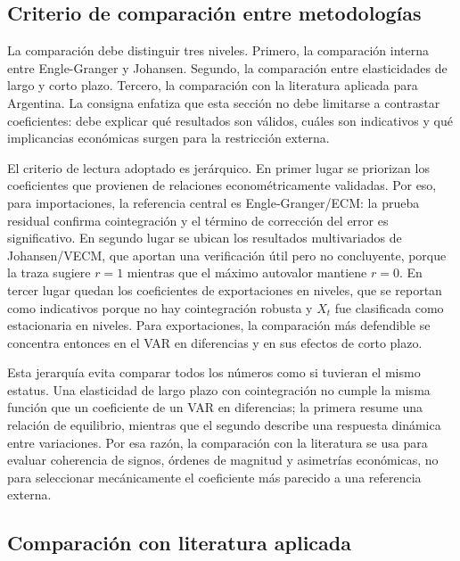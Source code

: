 \documentclass[11pt,a4paper]{article}
\begin{document}
	\subsection{Criterio de comparación entre metodologías}
	\label{subsec:comparacion-metodologias}
	
	La comparación debe distinguir tres niveles. Primero, la comparación interna
	entre Engle-Granger y Johansen. Segundo, la comparación entre elasticidades de
	largo y corto plazo. Tercero, la comparación con la literatura aplicada para
	Argentina. La consigna enfatiza que esta sección no debe limitarse a contrastar
	coeficientes: debe explicar qué resultados son válidos, cuáles son indicativos
	y qué implicancias económicas surgen para la restricción externa.
	
	El criterio de lectura adoptado es jerárquico. En primer lugar se priorizan los
	coeficientes que provienen de relaciones econométricamente validadas. Por eso,
	para importaciones, la referencia central es Engle-Granger/ECM: la prueba
	residual confirma cointegración y el término de corrección del error es
	significativo. En segundo lugar se ubican los resultados multivariados de
	Johansen/VECM, que aportan una verificación útil pero no concluyente, porque la
	traza sugiere \(r=1\) mientras que el máximo autovalor mantiene \(r=0\). En
	tercer lugar quedan los coeficientes de exportaciones en niveles, que se
	reportan como indicativos porque no hay cointegración robusta y \(X_t\) fue
	clasificada como estacionaria en niveles. Para exportaciones, la comparación
	más defendible se concentra entonces en el VAR en diferencias y en sus efectos
	de corto plazo.
	
	Esta jerarquía evita comparar todos los números como si tuvieran el mismo
	estatus. Una elasticidad de largo plazo con cointegración no cumple la misma
	función que un coeficiente de un VAR en diferencias; la primera resume una
	relación de equilibrio, mientras que el segundo describe una respuesta dinámica
	entre variaciones. Por esa razón, la comparación con la literatura se usa para
	evaluar coherencia de signos, órdenes de magnitud y asimetrías económicas, no
	para seleccionar mecánicamente el coeficiente más parecido a una referencia
	externa.
	
	\subsection{Comparación con literatura aplicada}
	\label{subsec:comparacion-literatura}
	
\end{document}
